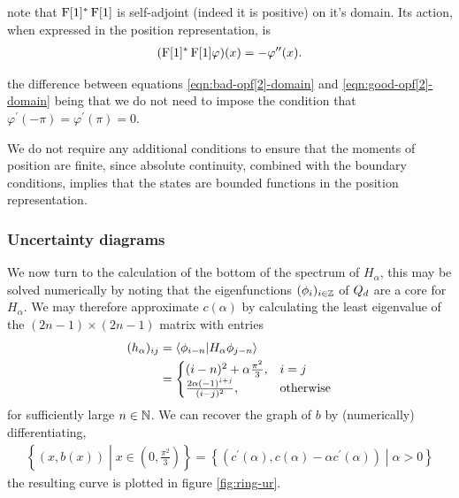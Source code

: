note that $\operatorname{F}[1]^*\operatorname{F}[1]$ is self-adjoint (indeed it is positive) on it's domain. Its action, when expressed in the position representation, is
\begin{align}
  (\operatorname{F}[1]^*\operatorname{F}[1]\varphi)(x) = -\varphi^{\prime\prime}(x).
\end{align}


the difference between equations \eqref{eqn:bad-opf[2]-domain} and \eqref{eqn:good-opf[2]-domain} being that we do not need to impose the condition that $\varphi^\prime(-\pi) = \varphi^\prime(\pi) = 0$. 


We do not require any additional conditions to ensure that the moments of position are finite, since absolute continuity, combined with the boundary conditions, implies that the states are bounded functions in the position representation.


\subsubsection{Uncertainty diagrams}
We now turn to the calculation of the bottom of the spectrum of $H_\alpha$, this may be solved numerically by noting that the eigenfunctions $(\phi_i)_{i\in\mathbb{Z}}$ of $Q_d$ are a core for $H_\alpha$. We may therefore approximate $c(\alpha)$ by calculating the least eigenvalue of the $(2n-1)\times (2n-1)$ matrix with entries
\begin{align}
  (h_\alpha)_{ij} &= \langle \phi_{i-n}|H_\alpha \phi_{j-n}\rangle\\
                  &= \begin{cases}(i-n)^2 + \alpha\frac{\pi^2}{3},& i = j\\ \frac{2 \alpha(-1)^{i+j}}{(i-j)^2}, & \text{otherwise}\end{cases}
\end{align}
for sufficiently large $n\in\mathbb{N}$. We can recover the graph of $b$ by (numerically) differentiating, 
\begin{align}
  \left\{(x,b(x))\middle|x\in \left(0,\frac{\pi^2}{3}\right)\right\} = \left\{ (c^\prime(\alpha), c(\alpha)-\alpha c^\prime(\alpha))\middle| \alpha > 0\right\}
\end{align}
the resulting curve is plotted in figure \ref{fig:ring-ur}.

